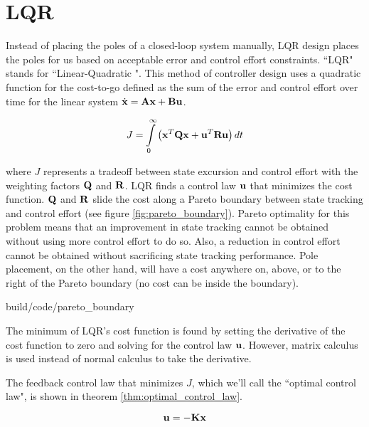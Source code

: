 \section{LQR} \label{sec:lqr}

Instead of placing the poles of a closed-loop \gls{system} manually, LQR design
places the poles for us based on acceptable \gls{error} and \gls{control effort}
constraints. ``LQR" stands for ``Linear-Quadratic
". This method of controller design uses a
quadratic function for the cost-to-go defined as the sum of the \gls{error} and
\gls{control effort} over time for the linear \gls{system}
$\dot{\mathbf{x}} = \mathbf{A}\mathbf{x} + \mathbf{B}\mathbf{u}$.

\begin{equation*}
  J = \int\limits_0^\infty \left(\mathbf{x}^T\mathbf{Q}\mathbf{x} +
    \mathbf{u}^T\mathbf{R}\mathbf{u}\right) dt
\end{equation*}

where $J$ represents a tradeoff between \gls{state} excursion and
\gls{control effort} with the weighting factors $\mathbf{Q}$ and $\mathbf{R}$. LQR
finds a \gls{control law} $\mathbf{u}$ that minimizes the cost function. $\mathbf{Q}$
and $\mathbf{R}$ slide the cost along a Pareto boundary between state tracking and
\gls{control effort} (see figure \ref{fig:pareto_boundary}). Pareto optimality
for this problem means that an improvement in state \gls{tracking} cannot be
obtained without using more \gls{control effort} to do so. Also, a reduction in
\gls{control effort} cannot be obtained without sacrificing state \gls{tracking}
performance. Pole placement, on the other hand, will have a cost anywhere on,
above, or to the right of the Pareto boundary (no cost can be inside the
boundary).

\begin{svg}{build/code/pareto_boundary}
  \caption{Pareto boundary for LQR}
  \label{fig:pareto_boundary}
\end{svg}

The minimum of LQR's cost function is found by setting the derivative of the
cost function to zero and solving for the \gls{control law} $\mathbf{u}$. However,
matrix calculus is used instead of normal calculus to take the derivative.

The feedback \gls{control law} that minimizes $J$, which we'll call the
``optimal control law", is shown in theorem \ref{thm:optimal_control_law}.

\begin{theorem}
  \label{thm:optimal_control_law}

  \begin{equation}
    \mathbf{u} = -\mathbf{K}\mathbf{x}
  \end{equation}
\end{theorem}

